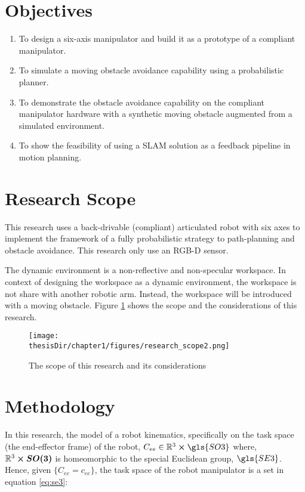 \section{Objectives}\label{sec:objectives}
\begin{enumerate}
  \item \label{objective1} 
    To design a six-axis manipulator and build it as a prototype
    of a compliant manipulator.
   \item \label{objective2} To simulate a moving obstacle avoidance capability using a probabilistic planner.
  \item \label{objective3} To demonstrate the obstacle avoidance capability on
    the compliant manipulator hardware with a synthetic moving obstacle augmented from a simulated environment.
  \item \label{objective4} To show the feasibility of using a SLAM solution 
    as a feedback pipeline in motion planning.

\end{enumerate}

\section{Research Scope}
This research uses a back-drivable (compliant) articulated robot with six axes to implement the framework of a
fully probabilistic strategy to path-planning and obstacle avoidance. This research only use an RGB-D sensor.

The dynamic environment is a non-reflective and non-specular workspace. 
In context of designing the workspace as a dynamic environment, 
the workspace is not share
with another robotic arm. Instead, the workspace will be introduced with a moving obstacle. 
Figure \ref{fig:research_scope}
shows the scope and the considerations of this research.

\begin{figure}[h]
  \centering
  \texttt{[image: \\thesisDir/chapter1/figures/research\_scope2.png]}
  \caption{The scope of this research and its considerations}
  \label{fig:research_scope}
\end{figure}

\section{Methodology}\label{sec:methodology}

In this research, the model of a robot kinematics, specifically
on the task space (the end-effector frame) of the robot, 
${C}_{ee} \in \mathbb{R}^3 \cross \gls{SO3}$ where, 
$\mathbb{R}^3 \cross \vb*{SO(3)}$ is homeomorphic to the special 
Euclidean group, $\gls{SE3}$. 
Hence, given $\{{C}_{ee}=c_{ee}\}$, the task space 
of the robot manipulator is a set in equation \ref{eq:se3}:

